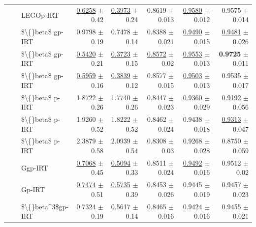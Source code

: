 \begin{longtable}{llp{}rrrrr}
 &  & LEGOp-IRT & \underline{0.6258} {\scriptsize $\pm$ 0.42} & \underline{0.3973} {\scriptsize $\pm$ 0.24} & 0.8619 {\scriptsize $\pm$ 0.013} & \underline{0.9580} {\scriptsize $\pm$ 0.012} & 0.9575 {\scriptsize $\pm$ 0.014} \\
 &  & \$\textbackslash\{\}beta\$ gp-IRT & 0.9798 {\scriptsize $\pm$ 0.19} & 0.7478 {\scriptsize $\pm$ 0.14} & 0.8388 {\scriptsize $\pm$ 0.021} & \underline{0.9490} {\scriptsize $\pm$ 0.015} & \underline{0.9481} {\scriptsize $\pm$ 0.026} \\
 &  & \$\textbackslash\{\}beta\$ gp-IRT & \underline{0.5420} {\scriptsize $\pm$ 0.21} & \underline{0.3723} {\scriptsize $\pm$ 0.15} & \underline{0.8572} {\scriptsize $\pm$ 0.02} & \underline{0.9553} {\scriptsize $\pm$ 0.013} & \textbf{0.9725} {\scriptsize $\pm$ 0.011} \\
 &  & \$\textbackslash\{\}beta\$ gp-IRT & \underline{0.5959} {\scriptsize $\pm$ 0.16} & \underline{0.3839} {\scriptsize $\pm$ 0.12} & 0.8577 {\scriptsize $\pm$ 0.015} & \underline{0.9503} {\scriptsize $\pm$ 0.013} & 0.9535 {\scriptsize $\pm$ 0.017} \\
 &  & \$\textbackslash\{\}beta\$ p-IRT & 1.8722 {\scriptsize $\pm$ 0.26} & 1.7740 {\scriptsize $\pm$ 0.26} & 0.8447 {\scriptsize $\pm$ 0.023} & \underline{0.9360} {\scriptsize $\pm$ 0.029} & \underline{0.9192} {\scriptsize $\pm$ 0.056} \\
 &  & \$\textbackslash\{\}beta\$ p-IRT & 1.9260 {\scriptsize $\pm$ 0.52} & 1.8222 {\scriptsize $\pm$ 0.52} & 0.8462 {\scriptsize $\pm$ 0.024} & 0.9438 {\scriptsize $\pm$ 0.018} & \underline{0.9313} {\scriptsize $\pm$ 0.047} \\
 &  & \$\textbackslash\{\}beta\$ p-IRT & 2.3879 {\scriptsize $\pm$ 0.58} & 2.0939 {\scriptsize $\pm$ 0.54} & 0.8308 {\scriptsize $\pm$ 0.03} & 0.9268 {\scriptsize $\pm$ 0.028} & 0.8750 {\scriptsize $\pm$ 0.059} \\
 &  & Ggp-IRT & \underline{0.7068} {\scriptsize $\pm$ 0.45} & \underline{0.5094} {\scriptsize $\pm$ 0.33} & 0.8511 {\scriptsize $\pm$ 0.024} & \underline{0.9492} {\scriptsize $\pm$ 0.016} & 0.9512 {\scriptsize $\pm$ 0.02} \\
 &  & Gp-IRT & \underline{0.7474} {\scriptsize $\pm$ 0.51} & \underline{0.5735} {\scriptsize $\pm$ 0.39} & 0.8453 {\scriptsize $\pm$ 0.026} & 0.9445 {\scriptsize $\pm$ 0.019} & 0.9457 {\scriptsize $\pm$ 0.023} \\
 &  & \$\textbackslash\{\}beta\textasciicircum{}3\$gp-IRT & 0.7324 {\scriptsize $\pm$ 0.19} & 0.5617 {\scriptsize $\pm$ 0.14} & 0.8465 {\scriptsize $\pm$ 0.016} & 0.9424 {\scriptsize $\pm$ 0.016} & 0.9455 {\scriptsize $\pm$ 0.021} \\

\end{longtable}

